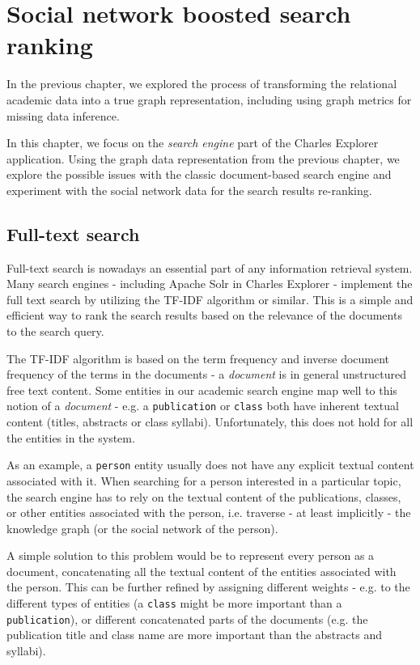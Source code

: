 \chapter{Social network boosted search ranking}

In the previous chapter, we explored the process of transforming the relational academic data 
into a true graph representation, including using graph metrics for missing data inference.

In this chapter, we focus on the \textit{search engine} part of the Charles Explorer application.
Using the graph data representation from the previous chapter, we explore the possible issues with the classic 
document-based search engine and experiment with the social network data for the search results re-ranking.

\section{Full-text search}

Full-text search is nowadays an essential part of any information retrieval system. 
Many search engines - including Apache Solr in Charles Explorer - implement the full text search by utilizing the TF-IDF algorithm or similar.
This is a simple and efficient way to rank the search results based on the relevance of the documents to the search query.

The TF-IDF algorithm is based on the term frequency and inverse document frequency of the terms in the documents - a \textit{document} is in general unstructured free text content.
Some entities in our academic search engine map well to this notion of a \textit{document} - e.g. a \texttt{publication} or \texttt{class} both have inherent textual content (titles, abstracts or class syllabi).
Unfortunately, this does not hold for all the entities in the system.

As an example, a \texttt{person} entity usually does not have any explicit textual content associated with it. 
When searching for a person interested in a particular topic, the search engine has to rely on the textual content of the publications, classes, 
or other entities associated with the person, i.e. traverse - at least implicitly - the knowledge graph (or the social network of the person).

A simple solution to this problem would be to represent every person as a document, concatenating all the textual content of the entities associated with the person.
This can be further refined by assigning different weights - e.g. to the different types of entities (a \texttt{class} might be more important than a \texttt{publication}), 
or different concatenated parts of the documents (e.g. the publication title and class name are more important than the abstracts and syllabi).

